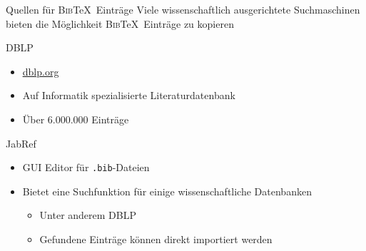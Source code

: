 \documentclass[aspectratio=169]{beamer}
\providecommand{\tightlist}{\setlength{\itemsep}{0pt}\setlength{\parskip}{0pt}}
\newcommand\citestyle[1]{\textcolor{foreground-secondary}{\textsuperscript{#1}}}
\let\oldcite=\cite
\renewcommand{\cite}[1]{\citestyle{\oldcite{#1}}}
\let\oldautocite\autocite
\renewcommand{\autocite}[1]{\citestyle{\oldautocite{#1}}}
\begin{document}
    \begin{frame}{Quellen für \textsc{Bib}\TeX~Einträge}
    \protect\hypertarget{quellen-fuxfcr-eintruxe4ge}{}
    Viele wissenschaftlich ausgerichtete Suchmaschinen bieten die
    Möglichkeit \textsc{Bib}\TeX~Einträge zu kopieren
    \cite{google-scholar}\cite{dblp}\\

    \begin{block}{DBLP \autocite{dblp}}
    \protect\hypertarget{dblp-dblp}{}
    \begin{itemize}
    \tightlist
    \item
      \href{https://dblp.org/}{\alert{\underline{dblp.org}}}
    \item
      Auf Informatik spezialisierte Literaturdatenbank
    \item
      Über 6.000.000 Einträge
    \end{itemize}
    \end{block}
    \end{frame}

    \begin{frame}[fragile]{JabRef \autocite{jabref}}
    \protect\hypertarget{jabref-jabref}{}
    \begin{itemize}
    \tightlist
    \item
      GUI Editor für \texttt{.bib}-Dateien
    \item
      Bietet eine Suchfunktion für einige wissenschaftliche Datenbanken

      \begin{itemize}
      \tightlist
      \item
        Unter anderem DBLP
      \item
        Gefundene Einträge können direkt importiert werden
      \end{itemize}
    \end{itemize}
    \end{frame}
\end{document}
